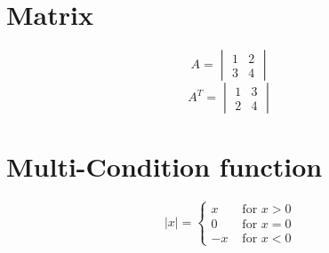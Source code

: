 \documentclass{article}
\theoremstyle{remark} %
\begin{document}
\section{Matrix}
\[
A =
\begin{vmatrix}
	1 & 2 \\
	3 & 4
\end{vmatrix}
\]
\[
A^{T} = 
\begin{vmatrix}
	1 & 3 \\
	2 & 4
\end{vmatrix}
\]

\section{Multi-Condition function}
\[
|x| = 
 \begin{cases}
 	x & \text{ for } x > 0\\
 	0 & \text{ for } x = 0\\
 	-x & \text{ for } x < 0
 \end{cases}
\]

\end{document}
